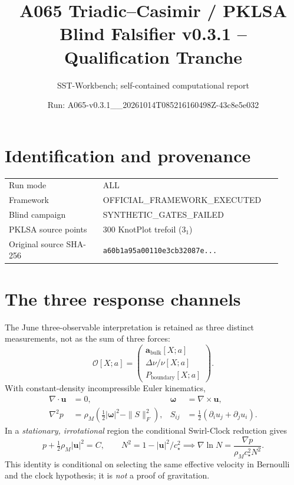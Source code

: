 \documentclass[10pt,a4paper]{article}
\title{A065 Triadic--Casimir / PKLSA\\ Blind Falsifier v0.3.1 -- Qualification Tranche}
\author{SST-Workbench; self-contained computational report}
\date{Run: A065-v0.3.1\_\_20261014T085216160498Z-43c8e5e032}
\begin{document}
\maketitle
\begin{center}
\end{center}
\section{Identification and provenance}
\begin{tabular}{@{}p{0.32\linewidth}p{0.60\linewidth}@{}}
\toprule
Run mode & ALL \\
Framework & OFFICIAL\_FRAMEWORK\_EXECUTED \\
Blind campaign & SYNTHETIC\_GATES\_FAILED \\
PKLSA source points & 300 KnotPlot trefoil ($3_1$) \\
Original source SHA-256 & \texttt{a60b1a95a00110e3cb32087e...} \\
\bottomrule
\end{tabular}
\section{The three response channels}
The June three-observable interpretation is retained as three distinct measurements, not as the sum of three forces:
\[
\mathcal O[X;a]=\begin{pmatrix}
\mathbf a_{\mathrm{bulk}}[X;a]\\
\Delta\nu/\nu[X;a]\\
P_{\mathrm{boundary}}[X;a]
\end{pmatrix}.
\]
With constant-density incompressible Euler kinematics,
\begin{align}
\nabla\cdot\mathbf u&=0,&
\boldsymbol\omega&=\nabla\times\mathbf u,\\
\nabla^2p&=\rho_M\left(\tfrac12|\boldsymbol\omega|^2-\|S\|_F^2\right),&
S_{ij}&=\tfrac12(\partial_i u_j+\partial_j u_i).
\end{align}
In a \emph{stationary, irrotational} region the conditional Swirl-Clock reduction gives
\[
p+\tfrac12\rho_M|\mathbf u|^2=C,\qquad
N^2=1-|\mathbf u|^2/c_\star^2
\implies\nabla\ln N=\frac{\nabla p}{\rho_Mc_\star^2N^2}.
\]
This identity is conditional on selecting the same effective velocity in Bernoulli and the clock hypothesis; it is \emph{not} a proof of gravitation.
\end{document}
